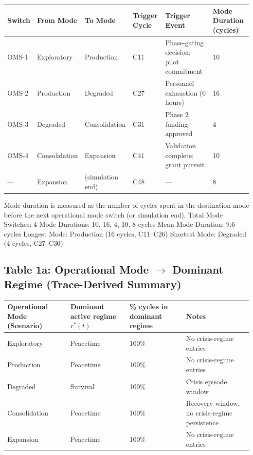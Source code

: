 \documentclass[11pt,a4paper]{article}
\begin{document}
\begin{center}
\begin{tabular}{llllll}
\toprule
\textbf{Switch} & \textbf{From Mode} & \textbf{To Mode} & \textbf{Trigger Cycle} & \textbf{Trigger Event} & \textbf{Mode Duration (cycles)} \\
\midrule
OMS-1 & Exploratory & Production & C11 & Phase-gating decision; pilot commitment & 10 \\
OMS-2 & Production & Degraded & C27 & Personnel exhaustion (0 hours) & 16 \\
OMS-3 & Degraded & Consolidation & C31 & Phase 2 funding approved & 4 \\
OMS-4 & Consolidation & Expansion & C41 & Validation complete; grant pursuit & 10 \\
--- & Expansion & (simulation end) & C48 & --- & 8 \\
\bottomrule
\end{tabular}
\end{center}

Mode duration is measured as the number of cycles spent in the destination mode before the next operational mode switch (or simulation end). Total Mode Switches: 4 Mode Durations: 10, 16, 4, 10, 8 cycles Mean Mode Duration: 9.6 cycles Longest Mode: Production (16 cycles, C11--C26) Shortest Mode: Degraded (4 cycles, C27--C30)

\subsection*{Table 1a: Operational Mode $\to$ Dominant Regime (Trace-Derived Summary)}

\begin{center}
\begin{tabular}{llll}
\toprule
\textbf{Operational Mode (Scenario)} & \textbf{Dominant active regime $r^*(t)$} & \textbf{\% cycles in dominant regime} & \textbf{Notes} \\
\midrule
Exploratory & Peacetime & 100\% & No crisis-regime entries \\
Production & Peacetime & 100\% & No crisis-regime entries \\
Degraded & Survival & 100\% & Crisis episode window \\
Consolidation & Peacetime & 100\% & Recovery window, no crisis-regime persistence \\
Expansion & Peacetime & 100\% & No crisis-regime entries \\
\bottomrule
\end{tabular}
\end{center}
\end{document}
